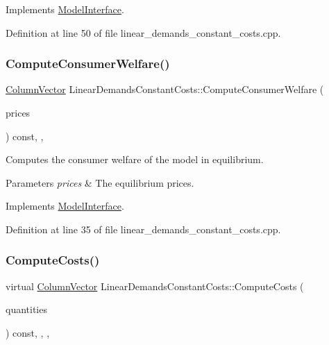 Implements \hyperlink{classModelInterface_abbc3c44c6d41b596b6201a9e61e1ff83}{Model\+Interface}.



Definition at line 50 of file linear\+\_\+demands\+\_\+constant\+\_\+costs.\+cpp.

\mbox{\label{classLinearDemandsConstantCosts_a9d3fa6a3b151c2f1703f23bbee6954cb}} 
\subsubsection{\texorpdfstring{Compute\+Consumer\+Welfare()}{ComputeConsumerWelfare()}}
{\footnotesize\ttfamily \hyperlink{classColumnVector}{Column\+Vector} Linear\+Demands\+Constant\+Costs\+::\+Compute\+Consumer\+Welfare (\begin{DoxyParamCaption}\item[{\hyperlink{classColumnVector}{Column\+Vector} const \&}]{prices }\end{DoxyParamCaption}) const\hspace{0.3cm}{\ttfamily [final]}, {\ttfamily [override]}, {\ttfamily [virtual]}}

Computes the consumer welfare of the model in equilibrium.


\begin{DoxyParams}{Parameters}
{\em prices} & The equilibrium prices. \\
\hline
\end{DoxyParams}


Implements \hyperlink{classModelInterface_a094ebb85618fb13bf38f6faff1f5dd7b}{Model\+Interface}.



Definition at line 35 of file linear\+\_\+demands\+\_\+constant\+\_\+costs.\+cpp.

\mbox{\label{classLinearDemandsConstantCosts_a74f907b4737865de086c8aa1f125d7c8}} 
\subsubsection{\texorpdfstring{Compute\+Costs()}{ComputeCosts()}}
{\footnotesize\ttfamily virtual \hyperlink{classColumnVector}{Column\+Vector} Linear\+Demands\+Constant\+Costs\+::\+Compute\+Costs (\begin{DoxyParamCaption}\item[{\hyperlink{classColumnVector}{Column\+Vector} const \&}]{quantities }\end{DoxyParamCaption}) const\hspace{0.3cm}{\ttfamily [inline]}, {\ttfamily [final]}, {\ttfamily [override]}, {\ttfamily [virtual]}}

